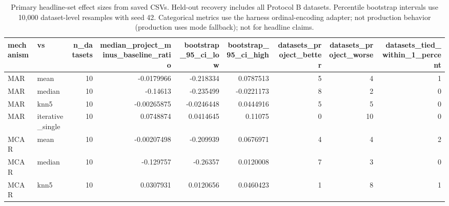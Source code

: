 \begin{table}[ht]
\centering
\caption{Primary headline-set effect sizes from saved CSVs. Held-out recovery includes all Protocol B datasets. Percentile bootstrap intervals use 10,000 dataset-level resamples with seed 42. Categorical metrics use the harness ordinal-encoding adapter; not production behavior (production uses mode fallback); not for headline claims.}
\label{tab:protocol_a_effect_sizes}
\begin{tabular}{llrrrrrrr}
\hline
 mechanism   & vs               &   n\_datasets &   median\_project\_minus\_baseline\_ratio &   bootstrap\_95\_ci\_low &   bootstrap\_95\_ci\_high &   datasets\_project\_better &   datasets\_project\_worse &   datasets\_tied\_within\_1\_percent \\
\hline
 MAR         & mean             &           10 &                           -0.0179966  &            -0.218334  &             0.0787513  &                         5 &                        4 &                                1 \\
 MAR         & median           &           10 &                           -0.14613    &            -0.235499  &            -0.0221173  &                         8 &                        2 &                                0 \\
 MAR         & knn5             &           10 &                           -0.00265875 &            -0.0246448 &             0.0444916  &                         5 &                        5 &                                0 \\
 MAR         & iterative\_single &           10 &                            0.0748874  &             0.0414645 &             0.11075    &                         0 &                       10 &                                0 \\
 MCAR        & mean             &           10 &                           -0.00207498 &            -0.209939  &             0.0676971  &                         4 &                        4 &                                2 \\
 MCAR        & median           &           10 &                           -0.129757   &            -0.26357   &             0.0120008  &                         7 &                        3 &                                0 \\
 MCAR        & knn5             &           10 &                            0.0307931  &             0.0120656 &             0.0460423  &                         1 &                        8 &                                1 \\

\end{tabular}
\end{table}
